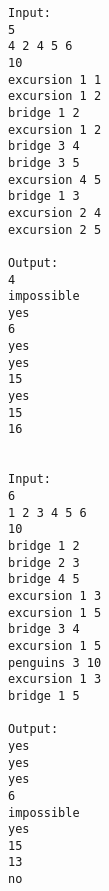 \begin{verbatim}
Input:
5
4 2 4 5 6
10
excursion 1 1
excursion 1 2
bridge 1 2
excursion 1 2
bridge 3 4
bridge 3 5
excursion 4 5
bridge 1 3
excursion 2 4
excursion 2 5

Output:
4
impossible
yes
6
yes
yes
15
yes
15
16


Input:
6
1 2 3 4 5 6
10
bridge 1 2
bridge 2 3
bridge 4 5
excursion 1 3
excursion 1 5
bridge 3 4
excursion 1 5
penguins 3 10
excursion 1 3
bridge 1 5

Output:
yes
yes
yes
6
impossible
yes
15
13
no
\end{verbatim}